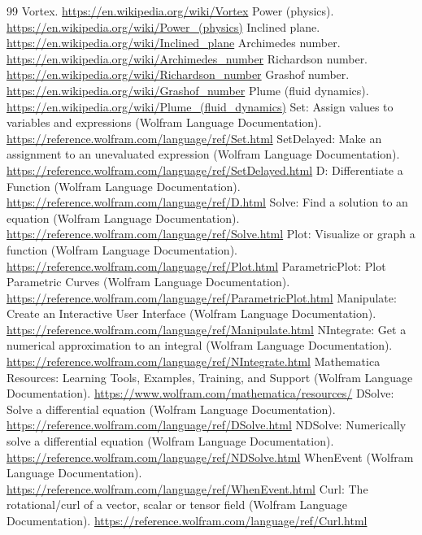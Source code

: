 \documentclass[10pt,openany]{book}
\begin{document}
\begin{thebibliography}{99}
 Vortex. \url{https://en.wikipedia.org/wiki/Vortex}
 Power (physics). \url{https://en.wikipedia.org/wiki/Power_(physics)}
 Inclined plane. \url{https://en.wikipedia.org/wiki/Inclined_plane}
 Archimedes number. \url{https://en.wikipedia.org/wiki/Archimedes_number}
 Richardson number. \url{https://en.wikipedia.org/wiki/Richardson_number}
 Grashof number. \url{https://en.wikipedia.org/wiki/Grashof_number}
 Plume (fluid dynamics). \url{https://en.wikipedia.org/wiki/Plume_(fluid_dynamics)}
 Set: Assign values to variables and expressions (Wolfram Language Documentation). \url{https://reference.wolfram.com/language/ref/Set.html}
 SetDelayed: Make an assignment to an unevaluated expression (Wolfram Language Documentation). \url{https://reference.wolfram.com/language/ref/SetDelayed.html}
 D: Differentiate a Function (Wolfram Language Documentation). \url{https://reference.wolfram.com/language/ref/D.html}
 Solve: Find a solution to an equation (Wolfram Language Documentation). \url{https://reference.wolfram.com/language/ref/Solve.html}
 Plot: Visualize or graph a function (Wolfram Language Documentation). \url{https://reference.wolfram.com/language/ref/Plot.html}
 ParametricPlot: Plot Parametric Curves (Wolfram Language Documentation). \url{https://reference.wolfram.com/language/ref/ParametricPlot.html}
 Manipulate: Create an Interactive User Interface (Wolfram Language Documentation). \url{https://reference.wolfram.com/language/ref/Manipulate.html}
 NIntegrate: Get a numerical approximation to an integral (Wolfram Language Documentation). \url{https://reference.wolfram.com/language/ref/NIntegrate.html}
 Mathematica Resources: Learning Tools, Examples, Training, and Support (Wolfram Language Documentation). \url{https://www.wolfram.com/mathematica/resources/}
 DSolve: Solve a differential equation (Wolfram Language Documentation). \url{https://reference.wolfram.com/language/ref/DSolve.html}
 NDSolve: Numerically solve a differential equation (Wolfram Language Documentation). \url{https://reference.wolfram.com/language/ref/NDSolve.html}
 WhenEvent (Wolfram Language Documentation). \url{https://reference.wolfram.com/language/ref/WhenEvent.html}
 Curl: The rotational/curl of a vector, scalar or tensor field (Wolfram Language Documentation). \url{https://reference.wolfram.com/language/ref/Curl.html}

\end{thebibliography}
\end{document}
